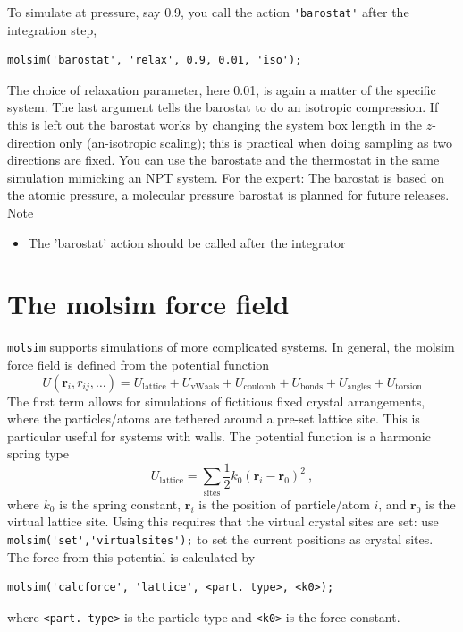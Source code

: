 \documentclass[11pt]{article}
\begin{document}
To simulate at pressure, say 0.9, you call the action \verb!'barostat'! after
the integration step,
\begin{verbatim}
molsim('barostat', 'relax', 0.9, 0.01, 'iso');
\end{verbatim}
The choice of relaxation parameter, here 0.01, is again a matter of the specific
system. The last argument tells the barostat to do an isotropic compression. If
this is left out the barostat works by changing the system box length in the
$z$-direction only (an-isotropic scaling); this is practical when doing sampling
as two directions are fixed. You can use the barostate and the thermostat
in the same simulation mimicking an NPT system. For the expert: The barostat is
based on the atomic pressure, a molecular pressure barostat is planned for
future releases.  Note
\begin{itemize}
  \item The \textsf{'barostat'} action should be called after the integrator
\end{itemize}

\section{The \textsf{molsim} force field}
\verb!molsim! supports simulations of more complicated systems. In general, the
\textsf{molsim} force field is defined from the potential function
\begin{equation}
  U(\mathbf{r}_i, r_{ij}, \ldots)
  =  U_\mathrm{lattice} + U_\mathrm{vWaals} + U_{\mathrm{coulomb}} +
  U_\mathrm{bonds} + U_\mathrm{angles} + 
  U_\mathrm{torsion}
\end{equation}
The first term allows for simulations of fictitious fixed crystal arrangements,
where the particles/atoms are tethered around a pre-set lattice site. This is
particular useful for systems with walls. The potential function is a harmonic
spring type
\begin{equation}
  U_\mathrm{lattice} =
  \sum_\mathrm{sites} \frac{1}{2}k_0 (\mathbf{r}_i - \mathbf{r}_0)^2 \ ,
\end{equation}
where $k_0$ is the spring constant, $\mathbf{r}_i$ is the position of
particle/atom $i$, and $\mathbf{r}_0$ is the virtual lattice site. Using this
requires that the virtual crystal sites are set: use
\verb!molsim('set','virtualsites');! to set the current positions as crystal
sites. The force from this potential is calculated by
\begin{verbatim}
molsim('calcforce', 'lattice', <part. type>, <k0>);
\end{verbatim}
where \verb!<part. type>! is the particle type and \verb!<k0>! is the force
constant. 
\end{document}
